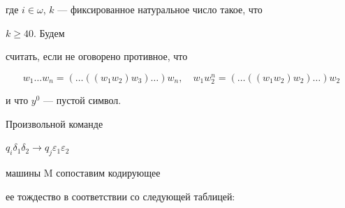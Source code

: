 где $i\in\omega$, $k$ --- фиксированное натуральное число такое, что 


$k\ge40$. Будем 


считать, если не оговорено противное, что 


$$ 


w_1\dotsc w_n=(\dotsc((w_1w_2)w_3)\dotsc)w_n,\quad 


w_1w^n_2=(\dotsc((w_1w_2)w_2)\dotsc)w_2 


$$ 


и что $y^0$ --- пустой символ. 


 


Произвольной команде


$q_i\delta_1\delta_2\to q_j\varepsilon_1\varepsilon_2$


машины M сопоставим кодирующее 


ее тождество в соответствии со следующей таблицей: 


\medskip 


 


